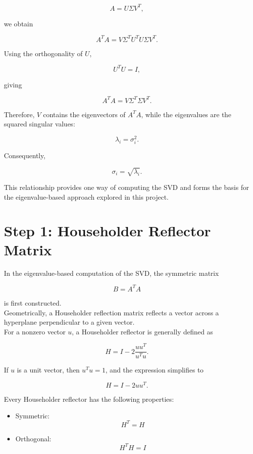 \documentclass{article}
\begin{document}
\[
    A = U\Sigma V^{T},
\]

we obtain

\[
    A^{T}A
    =
    V\Sigma^{T}U^{T}U\Sigma V^{T}.
\]

Using the orthogonality of $U$,

\[
    U^{T}U = I,
\]

giving

\[
    A^{T}A = V\Sigma^{T}\Sigma V^{T}.
\]

Therefore, $V$ contains the eigenvectors of $A^{T}A$, while the
eigenvalues are the squared singular values:

\[
    \lambda_i = \sigma_i^2.
\]

Consequently,

\[
    \sigma_i = \sqrt{\lambda_i}.
\]

This relationship provides one way of computing the SVD and forms
the basis for the eigenvalue-based approach explored in this project.

\section{Step 1: Householder Reflector Matrix}

In the eigenvalue-based computation of the SVD, the symmetric
matrix

\[
    B = A^T A
\]

is first constructed.\\

Geometrically, a Householder reflection matrix reflects a vector
across a hyperplane perpendicular to a given vector.\\

For a nonzero vector $u$, a Householder reflector is generally
defined as

\[
    H = I - 2\frac{uu^T}{u^T u}.
\]

If $u$ is a unit vector, then $u^T u = 1$, and the expression
simplifies to

\[
    H = I - 2uu^T.
\]

Every Householder reflector has the following properties:

\begin{itemize}

    \item Symmetric:
          \[
              H^T = H
          \]

    \item Orthogonal:
          \[
              H^T H = I
          \]

\end{itemize}
\end{document}
